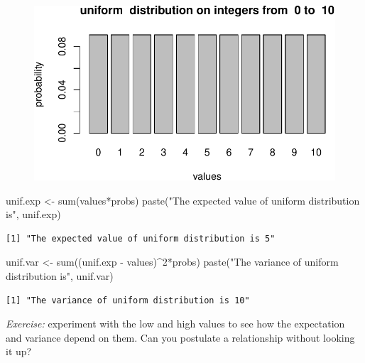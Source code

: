 \documentclass[
  letterpaper,
  DIV=11,
  numbers=noendperiod]{scrreprt}
\newenvironment{Shaded}{\begin{snugshade}}{\end{snugshade}}
\newcommand{\DecValTok}[1]{\textcolor[rgb]{0.68,0.00,0.00}{#1}}
\newcommand{\FunctionTok}[1]{\textcolor[rgb]{0.28,0.35,0.67}{#1}}
\newcommand{\NormalTok}[1]{\textcolor[rgb]{0.00,0.23,0.31}{#1}}
\newcommand{\OtherTok}[1]{\textcolor[rgb]{0.00,0.23,0.31}{#1}}
\newcommand{\SpecialCharTok}[1]{\textcolor[rgb]{0.37,0.37,0.37}{#1}}
\newcommand{\StringTok}[1]{\textcolor[rgb]{0.13,0.47,0.30}{#1}}
\begin{document}
\begin{figure}[H]

{\centering \includegraphics{./04-distributions_files/figure-pdf/unnamed-chunk-1-1.pdf}

}

\end{figure}

\begin{Shaded}
\begin{Highlighting}[]
\NormalTok{unif.exp }\OtherTok{\textless{}{-}} \FunctionTok{sum}\NormalTok{(values}\SpecialCharTok{*}\NormalTok{probs)}
\FunctionTok{paste}\NormalTok{(}\StringTok{"The expected value of uniform distribution is"}\NormalTok{, unif.exp)}
\end{Highlighting}
\end{Shaded}

\begin{verbatim}
[1] "The expected value of uniform distribution is 5"
\end{verbatim}

\begin{Shaded}
\begin{Highlighting}[]
\NormalTok{unif.var }\OtherTok{\textless{}{-}} \FunctionTok{sum}\NormalTok{((unif.exp }\SpecialCharTok{{-}}\NormalTok{ values)}\SpecialCharTok{\^{}}\DecValTok{2}\SpecialCharTok{*}\NormalTok{probs)}
\FunctionTok{paste}\NormalTok{(}\StringTok{"The variance of uniform distribution is"}\NormalTok{, unif.var)}
\end{Highlighting}
\end{Shaded}

\begin{verbatim}
[1] "The variance of uniform distribution is 10"
\end{verbatim}

\emph{Exercise:} experiment with the low and high values to see how the
expectation and variance depend on them. Can you postulate a
relationship without looking it up?
\end{document}
